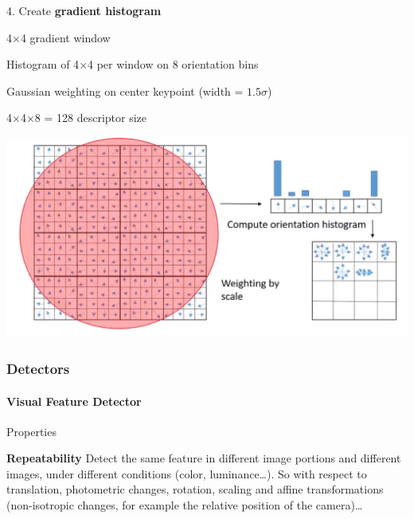 \documentclass[10pt]{report}
\begin{document}
\pagebreak
\begin{list}{}{}
	\item[4.] Create \textbf{gradient histogram}\begin{list}{}{}
		\item 4$\times$4 gradient window
		\item Histogram of 4$\times$4 per window on 8 orientation bins
		\item Gaussian weighting on center keypoint (width = $1.5\sigma$)
		\item 4$\times$4$\times$8 = 128 descriptor size
	\end{list}
\end{list}
\begin{center}
	\includegraphics[scale=0.5]{3.png}
\end{center}
\subsubsection{Detectors}
\paragraph{Visual Feature Detector} Properties
\begin{list}{}{}
	\item \textbf{Repeatability} Detect the same feature in different image portions and different images, under different conditions (color, luminance\ldots). So with respect to translation, photometric changes, rotation, scaling and affine transformations (non-isotropic changes, for example the relative position of the camera)\ldots
\end{list}
\end{document}
